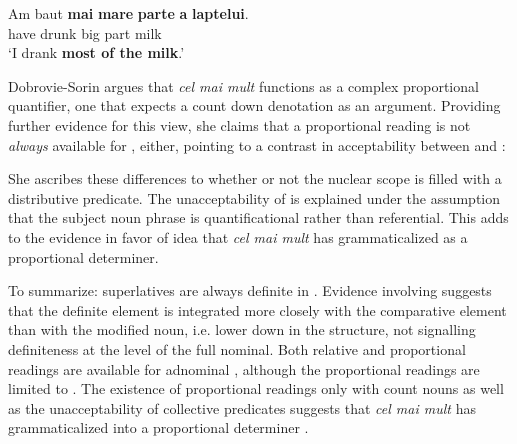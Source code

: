 \documentclass[output=paper
,modfonts
,nonflat]{langsci/langscibook}
\begin{document}
\ea \label{ex:coppockstrand:49}
\gll Am baut \textbf{mai} \textbf{mare} \textbf{parte} \textbf{a} \textbf{laptelui}.\\
have drunk \cmpr{} big part \gen{} milk\\
\glt `I drank \textbf{most of the milk}.'
\z

Dobrovie-Sorin argues that \textit{cel mai mult} functions as a complex proportional quantifier, one that expects a count down denotation as an argument. Providing further evidence for this view, she claims that a proportional reading is not \textit{always} available for , either, pointing to a contrast in acceptability between  and :

\z

\z 

She ascribes these differences to whether or not the nuclear scope is filled with a distributive predicate. The unacceptability of  is explained under the assumption that the subject  noun phrase is quantificational rather than referential. This adds to the  evidence in favor of  idea that \textit{cel mai mult} has grammaticalized as a proportional determiner.

To summarize:  superlatives are always definite in . Evidence involving  suggests that the definite element is integrated more closely with the comparative element than with the modified noun, i.e. lower down in the structure, not signalling definiteness at the level of the full nominal.  Both relative and proportional readings are available for adnominal , although the proportional readings are limited to . The existence of proportional readings only with count nouns as well as the unacceptability of collective predicates suggests that \textit{cel mai mult} has grammaticalized into a proportional determiner \citep{Dobrovie-Sorin2015}.
\end{document}

